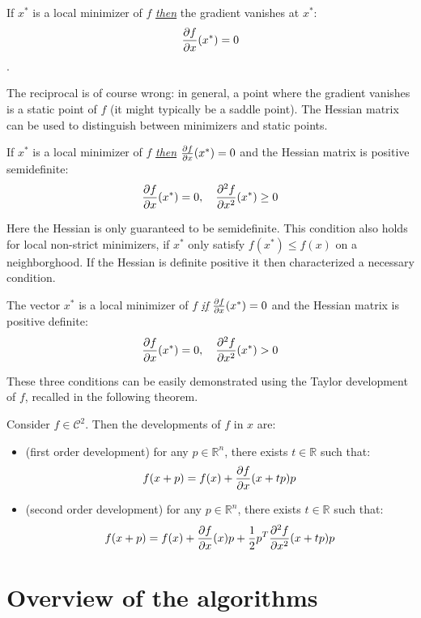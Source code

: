 \documentclass{book}
\begin{document}
\begin{theorem}
  If $x^*$ is a local minimizer of $f$ \emph{\underline{then}} the gradient vanishes at $x^*$: \[\frac{\partial{f}}{\partial{x}}(x^*) = 0\].
\end{theorem}

The reciprocal is of course wrong: in general, a point where the gradient vanishes is a static point of $f$ (it might typically be a saddle point). The Hessian matrix can be used to distinguish between minimizers and static points.

\begin{theorem}
If $x^*$ is a local minimizer of $f$ \emph{\underline{then}} $\frac{\partial{f}}{\partial{x}}(x^*) = 0$ and the Hessian matrix is positive semidefinite: \[ \frac{\partial{f}}{\partial{x}}(x^*) = 0, \quad \frac{\partial^2{f}}{\partial{x}^2}(x^*) \ge 0 \]
\end{theorem}

Here the Hessian is only guaranteed to be semidefinite.
This condition also holds for local non-strict minimizers, \mie if $x^*$ only satisfy $f(x^*) \le f(x)$ on a neighborghood. If the Hessian is definite positive it then characterized a necessary condition. 

\begin{theorem}
The vector $x^*$ is a local minimizer of $f$ \emph{\underline{if}} $\frac{\partial{f}}{\partial{x}}(x^*) = 0$ and the Hessian matrix is positive definite: \[ \frac{\partial{f}}{\partial{x}}(x^*) = 0, \quad  \frac{\partial^2{f}}{\partial{x}^2}(x^*) > 0 \]
\end{theorem}

These three conditions can be easily demonstrated using the Taylor development of $f$, recalled in the following theorem.
\begin{theorem}
Consider $f\in\mathcal{C}^2$. Then the developments of $f$ in $x$ are:
\begin{itemize}
\item (first order development) for any $p\in \mathbb{R}^n$, there exists $t\in\mathbb{R}$ such that:
\[ f(x+p) = f(x) + \frac{\partial{f}}{\partial{x}}(x+tp) p \]
\item (second order development) for any $p\in \mathbb{R}^n$, there exists $t\in\mathbb{R}$ such that:
\[ f(x+p) = f(x) + \frac{\partial{f}}{\partial{x}}(x) p + \frac{1}{2} p^T \frac{\partial^2{f}}{\partial{x}^2}(x+tp)p  \]
\end{itemize}
\end{theorem}

\section{Overview of the algorithms}
\end{document}
